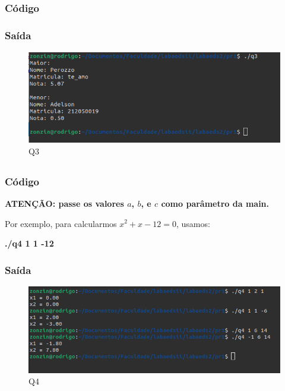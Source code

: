 \newpage

\subsection{}
\subsubsection*{Código}
\begin{multicols}{2}
	
\end{multicols}
\subsubsection*{Saída}
\begin{figure}[h!]
	\centering
	\includegraphics[width=0.5\linewidth]{imagens/saida_q3}
	\caption{Q3}
	\label{fig:saidaq3}
\end{figure}

\newpage

\subsection{}
\subsubsection*{Código}
\textbf{ATENÇÃO: passe os valores $a$, $b$, e $c$ como parâmetro da main.}

Por exemplo, para calcularmos $x^2+x-12=0$, usamos:

\textbf{./q4 1 1 -12}
\begin{multicols}{2}
	
\end{multicols}

\subsubsection*{Saída}
\begin{figure}[h!]
	\centering
	\includegraphics[width=0.7\linewidth]{imagens/saida_q4}
	\caption{Q4}
	\label{fig:saidaq4}
\end{figure}


